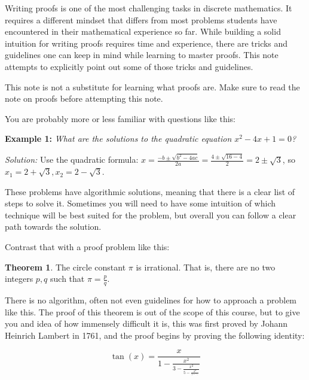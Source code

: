 \documentclass[11pt]{article}
\begin{document}
\maketitle
\fontsize{12}{15}\selectfont


    Writing proofs is one of the most challenging tasks in discrete mathematics.
    It requires a different mindset that differs from most problems students have encountered
    in their mathematical experience so far. While building a solid intuition for writing
    proofs requires time and experience, there are tricks and guidelines one can keep
    in mind while learning to master proofs. This note attempts to explicitly point out some
    of those tricks and guidelines.
    
    This note is not a substitute for learning what proofs are. Make sure to read the note
    on proofs before attempting this note.


    You are probably more or less familiar with questions like this:
    
    \textbf{Example 1:} \textit{What are the solutions to the quadratic equation
    $x^2-4x+1=0$?}
    
    \textit{Solution:} Use the quadratic formula: $x=\frac{-b\pm\sqrt{b^2-4ac}}{2a}
    =\frac{4\pm\sqrt{16-4}}{2}=2\pm\sqrt3$, so $x_1=2+\sqrt3,x_2=2-\sqrt3$.
    
    These problems have algorithmic solutions, meaning that there is a clear list of
    steps to solve it. Sometimes you will need to have some intuition of which
    technique will be best suited for the problem, but overall you can follow a
    clear path towards the solution.
    
    Contrast that with a proof problem like this:
    
    \textbf{Theorem 1}. The circle constant $\pi$ is irrational.
    That is, there are no two integers $p,q$ such that $\pi=\frac pq$.
    
    There is no algorithm, often not even guidelines for how to approach a problem like
    this. The proof of this theorem is out of the scope of this course, but to give you
    and idea of how immensely difficult it is, this was first proved by Johann
    Heinrich Lambert in 1761, and the proof begins by proving the following identity:
    
    $$\tan(x)=\frac{x}{1-\frac{x^2}{3-\frac{x^2}{5-\frac{x^2}{7-\ddots}}}}$$
    
\end{document}
